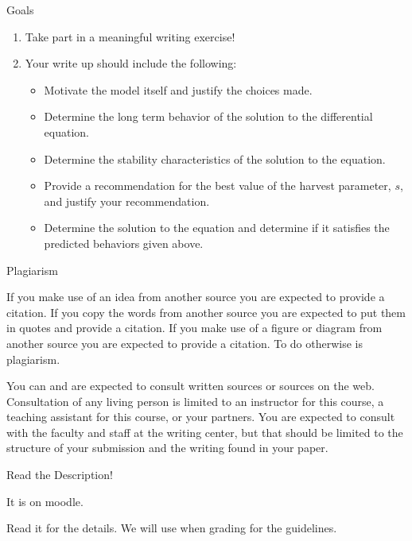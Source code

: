 \begin{frame}{Goals}

  \begin{enumerate}
  \item Take part in a meaningful writing exercise!
  \item Your write up should include the following:
    \begin{itemize}
    \item Motivate the model itself and justify the choices made.
    \item Determine the long term behavior of the solution to the
      differential equation.
    \item Determine the stability characteristics of the solution to the
      equation. 
    \item Provide a recommendation for the best value of the harvest
      parameter, $s$, and justify your recommendation.
    \item Determine the solution to the equation and determine if it
      satisfies the predicted behaviors given above.
    \end{itemize}
  \end{enumerate}
  
\end{frame}

\begin{frame}{Plagiarism}

  If you make use of an idea from another source you are expected to
  provide a citation. If you copy the words from another source you
  are expected to put them in quotes and provide a citation. If you
  make use of a figure or diagram from another source you are expected
  to provide a citation. To do otherwise is plagiarism.

  \vfill


  \vfill

  You can and are expected to consult written sources or sources on
  the web. Consultation of any living person is limited to an
  instructor for this course, a teaching assistant for this course, or
  your partners. You are expected to consult with the faculty and
  staff at the writing center, but that should be limited to the
  structure of your submission and the writing found in your paper.

\end{frame}

\begin{frame}{Read the Description!}

  It is on moodle.

  Read it for the details. We will use when grading for the
  guidelines.
  
\end{frame}

